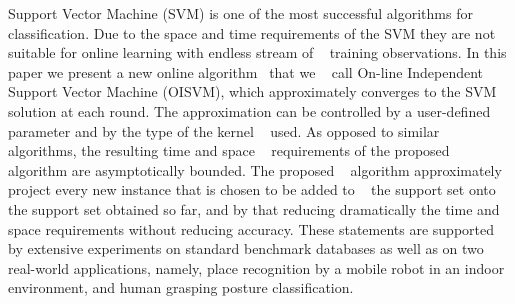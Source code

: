 Support Vector Machine (SVM) is one of the most successful algorithms
for classification. Due to the space and time requirements of the SVM
they are not suitable for online learning with endless stream of  
training
observations. In this paper we present a new online algorithm  that we  
call
On-line Independent Support Vector Machine (OISVM), which approximately
converges to the SVM solution at each round. The approximation can be
controlled by a user-defined parameter and by the type of the kernel  
used.
As opposed to similar algorithms, the resulting time and space  
requirements
of the proposed algorithm are asymptotically bounded. The proposed  
algorithm
approximately project every new instance that is chosen to be added to  
the
support set onto the support set obtained so far, and by that reducing
dramatically the time and space requirements without reducing accuracy.
These statements are supported by extensive experiments on standard
benchmark databases as well as on two real-world applications, namely,
place recognition by a mobile robot in an indoor environment,
and human grasping posture classification.
